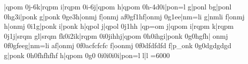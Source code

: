     |\Motif qpom\enotes
\temps\notes\ibu0j{-6}\bsqh k|\motif rqpm\enotes
\notes\tbsqh i|\motif rqpm\enotes
\zbarre\notes\ibu0i{-6}\bsqh j|\motif qpom\enotes
\notes\tbsqh h|\motif qpom\enotes
\changecontext
\notes\ibu0h{-4}\zq d\qh0i|\motif pon{=l}\enotes
\notes\tbsqh g|\motif ponl\enotes
\temps\NOtes\zh b\hu g|\Motif ponl\enotes
\changecontext\serre
\Notes\Ibu0hg3\bsqh i|\motif ponk\enotes
\Notes\tbsqh g|\motif ponk\enotes
\zbarre\Notes\Ibu0ge3\bsqh h|\motif onmj\enotes
\Notes\tbsqh f|\motif onmj\enotes
\zbarre\NOtes\zq a\qu f\sk\Ibu0gf1\bsqh h\tbsqh f|\Motif onmj\enotes
\barre\serre\notes\ibu0g1\bigna e\bsqh e\relax|\motif nm{=l}i\enotes
\notes\bsqh g|\motif nmli\enotes
\notes\bsqh f|\motif onmj\enotes
\notes\tbsqh h|\motif onmj\enotes
\notes\ibu0i1\bsqh g|\motif ponk\enotes
\notes\bsqh i|\motif ponk\enotes
\notes\bsqh h|\motif qpol\enotes
\notes{}\bsqh j|\motif qpol\enotes
%
\changecontext\notes\ibu0j1\bigna h\bsqh h\relax
|\motif qp{=o}m\enotes
\notes\bsqh j|\motif qpom\enotes
\notes\bsqh i|\motif rqpm\enotes
\notes\tbsqh k|\motif rqpm\enotes
\notes\ibu0j1\bsqh j|\motif srqm\enotes
\notes\bigfl g\tbsqh l|\motif srqm\enotes
%
\changecontexte
\NOtes\zq f\qu k\sk\ibu0i2\bsqh i\tbsqh k|\Motif rqpm\enotes
\zbarre\NOtes\ibu0i0\bsqh j\bsqh i\fl h\bsqh h\tbsqh j|\Motif qpom\enotes
%
\barre\NOtes\ibu0h0\bsqh i\bsqh h\bsqh g\tbsqh i|\Motif ponk\enotes
\zbarre\Notes\ibu0g0\bsqh h\bsqh g\bsqh f\tbsqh h|
\Motif onmj\enotes
\barre\Notes\ibu0f0\bsqh g\bsqh f\na e\bsqh e\tbsqh g|\Motif nm{=l}i\enotes
\temps\Notes\zh a\hu f|\Motif onmj\enotes
\barre\Notes\ibu0f0\na a\zq c\bsqh f\zq c\bsqh f\zq c\bsqh f\zq c\tbsqh
f|\na o\Motif onmj\enotes
\temps\Notes\ibu0f0\zq d\bqqh f\zq d\bqqh f\zq d\bqqh f\zq d\tbqqh
f|\Motif p{_o}nk\enotes
\barre\Notes\ibu0g0\zq d\bsqh g\zq d\bsqh g\zq d\bsqh g\zq d\tbsqh
g|\Motif ponk\enotes
\temps\Notes\ibu0h0\zq f\bsqh h\zq f\bsqh h\zq f\bsqh h\zq f\tbsqh
h|\Motif qpom\enotes
\barre\Notes\ibu0g0\relax
{}\qh0i\qh0i\qh0i\tqh0i|\Motif pon{=l}\enotes
\nspace\NOtes\pointdorgue l\hpause|\pointdorgue l\hpause\toctfin\enotes
\suspmorceau\def\everystaff{}\relax
\Eject
\relax\cleftoksi={{6}{0}{0}{0}}%
      \Eject{}\Interligne\relax
